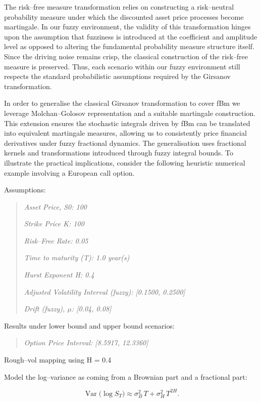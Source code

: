 \documentclass[12pt,a4paper]{report}
\numberwithin{equation}{section}
\begin{document}
The risk--free measure transformation relies on constructing a
risk--neutral probability measure under which the discounted asset price
processes become martingale. In our fuzzy environment, the validity of
this transformation hinges upon the assumption that fuzziness is
introduced at the coefficient and amplitude level as opposed to altering
the fundamental probability measure structure itself. Since the driving
noise remains crisp, the classical construction of the risk--free measure
is preserved. Thus, each scenario within our fuzzy environment still
respects the standard probabilistic assumptions required by the Girsanov
transformation.

In order to generalise the classical Girsanov transformation to cover
fBm we leverage Molchan--Golosov representation and a suitable
martingale construction. This extension ensures the stochastic integrals
driven by fBm can be translated into equivalent martingale measures,
allowing us to consistently price financial derivatives under fuzzy
fractional dynamics. The generalisation uses fractional kernels and
transformations introduced through fuzzy integral bounds. To illustrate
the practical implications, consider the following heuristic numerical
example involving a European call option.

Assumptions:

\begin{quote}
\emph{Asset Price, S0: 100}

\emph{Strike Price K: 100}

\emph{Risk--Free Rate: 0.05}

\emph{Time to maturity (T): 1.0 year(s)}

\emph{Hurst Exponent H: 0.4}

\emph{Adjusted Volatility Interval (fuzzy): {[}0.1500, 0.2500{]}}

\emph{Drift (fuzzy), $\mu$: {[}0.04, 0.08{]}}
\end{quote}

Results under lower bound and upper bound scenarios:

\begin{quote}
\emph{Option Price Interval: {[}8.5917, 12.3360{]}}
\end{quote}

Rough--vol mapping using H = 0.4

Model the log--variance as coming from a Brownian part and a fractional
part:

\[
\operatorname{Var}\!\bigl(\log S_T\bigr)\approx \sigma_B^{2}\,T+\sigma_H^{2}\,T^{2H}.
\]
\end{document}
